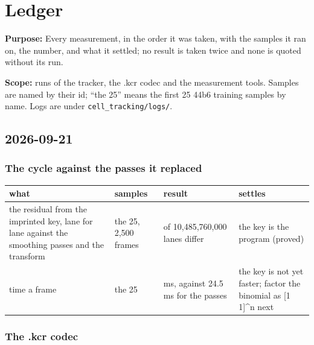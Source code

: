 \chapter{\texorpdfstring{Ledger}{Ledger}}
\label{chap:ledger}

\textbf{Purpose:} Every measurement, in the order it was taken, with the samples it ran on, the number, and what it settled; no result is taken twice and none is quoted without its run.

\textbf{Scope:} runs of the tracker, the .kcr codec and the measurement tools. Samples are named by their id; “the 25” means the first 25 44b6 training samples by name. Logs are under \texttt{cell\_\allowbreak{}tracking/\allowbreak{}logs/\allowbreak{}}.

\section{\texorpdfstring{2026-09-21}{2026-09-21}}

\subsection{\texorpdfstring{The cycle against the passes it replaced}{The cycle against the passes it replaced}}

{\footnotesize
\setlength{\tabcolsep}{6pt}
\begin{longtable}{>{\RaggedRight\arraybackslash}p{}>{\RaggedRight\arraybackslash}p{}>{\RaggedRight\arraybackslash}p{}>{\RaggedRight\arraybackslash}p{}}
\toprule
what & samples & result & settles \\
\midrule
\endhead
the residual from the imprinted key, lane for lane against the smoothing passes and the transform & the 25, 2,500 frames & 0 of 10,485,760,000 lanes differ & the key is the program (proved) \\
time a frame & the 25 & 31 ms, against 24.5 ms for the passes & the key is not yet faster; factor the binomial as [1 1]\textasciicircum{}n next \\
\bottomrule
\end{longtable}
}

\subsection{\texorpdfstring{The .kcr codec}{The .kcr codec}}

